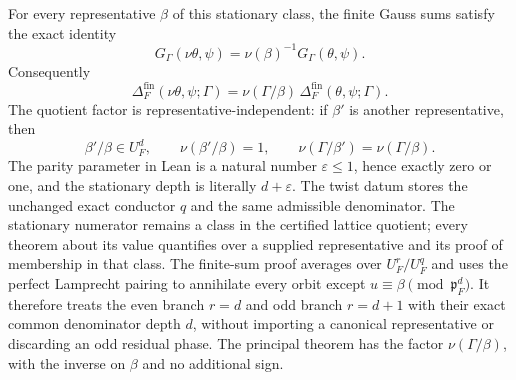 \begin{theorem}
For every representative $\beta$ of this stationary class, the finite
Gauss sums satisfy the exact identity
\[
 G_\Gamma(\nu\theta,\psi)
 =\nu(\beta)^{-1}G_\Gamma(\theta,\psi).
\]
Consequently
\[
 \boxed{
 \Delta_F^{\mathrm{fin}}(\nu\theta,\psi;\Gamma)
 =\nu(\Gamma/\beta)\,
  \Delta_F^{\mathrm{fin}}(\theta,\psi;\Gamma).}
\]
The quotient factor is representative-independent: if $\beta'$ is another
representative, then
\[
 \beta'/\beta\in U_F^d,
 \qquad
 \nu(\beta'/\beta)=1,
 \qquad
 \nu(\Gamma/\beta')=\nu(\Gamma/\beta).
\]
\leanok
{}
\FormalizationContract The parity parameter in Lean is a natural number
$\varepsilon\leq1$, hence exactly zero or one, and the stationary depth is
literally $d+\varepsilon$.  The twist datum stores the unchanged exact
conductor $q$ and the same admissible denominator.  The stationary numerator
remains a class in the certified lattice quotient; every theorem about its
value quantifies over a supplied representative and its proof of membership
in that class.  The finite-sum proof averages over $U_F^r/U_F^q$ and uses the
perfect Lamprecht pairing to annihilate every orbit except
$u\equiv\beta\pmod{\mathfrak p_F^d}$.  It therefore treats the even branch
$r=d$ and odd branch $r=d+1$ with their exact common denominator depth $d$,
without importing a canonical representative or discarding an odd residual
phase.  The principal theorem has the factor $\nu(\Gamma/\beta)$, with the
inverse on $\beta$ and no additional sign.
\end{theorem}
